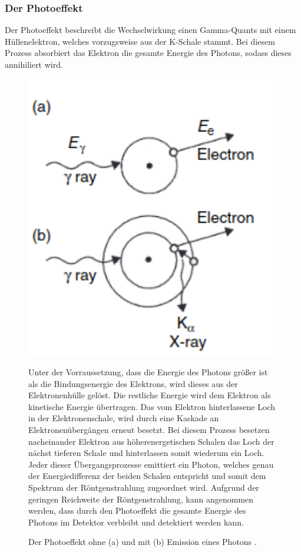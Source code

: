 \subsubsection*{Der Photoeffekt}
Der Photoeffekt beschreibt die Wechselwirkung einen Gamma-Quants mit einem Hüllenelektron, welches vorzugsweise aus der K-Schale stammt.
Bei diesem Prozess absorbiert das Elektron die gesamte Energie des Photons, sodass dieses annihiliert wird.
\FloatBarrier
\begin{figure}[h]
\begin{minipage}[t]{0.4\textwidth}
\vspace{0pt}
\centering
\includegraphics[width=1.1\textwidth]{Photoeffekt.png}
\caption{Der Photoeffekt ohne (a) und mit (b) Emission eines Photons \cite{quelle02}.}
\label{fig:tfig2}
\end{minipage}
\hfill
\begin{minipage}[t]{0.58\textwidth}
\vspace{0pt}
Unter der Vorraussetzung, dass die Energie des Photons größer ist als die Bindungsenergie des Elektrons, wird dieses aus der Elektronenhülle gelöst.
Die restliche Energie wird dem Elektron als kinetische Energie übertragen.
Das vom Elektron hinterlassene Loch in der Elektronenschale, wird durch eine Kaskade an Elektronenübergängen erneut besetzt.
Bei diesem Prozess besetzen nacheinander Elektron aus höherenergetischen Schalen das Loch der nächst tieferen Schale und hinterlassen somit wiederum ein Loch.
Jeder dieser Übergangsprozesse emittiert ein Photon, welches genau der Energiedifferenz der beiden Schalen entspricht und somit dem Spektrum der Röntgenstrahlung zugeordnet wird.
Aufgrund der geringen Reichweite der Röntgenstrahlung, kann angenommen werden, dass durch den Photoeffekt die gesamte Energie des Photons im Detektor verbleibt und detektiert werden kann.
\end{minipage}
\end{figure}
\FloatBarrier

